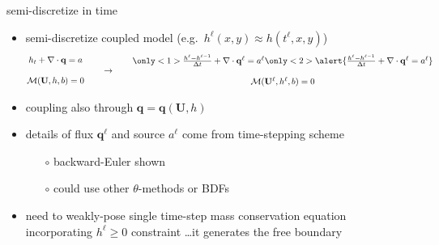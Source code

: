 \documentclass[xcolor={dvipsnames}]{beamer}
\newcommand\bq{\mathbf{q}}
\newcommand\bU{\mathbf{U}}
\newcommand\Div{\nabla\cdot}
\begin{document}
\begin{frame}{semi-discretize in time}

\begin{itemize}
\item semi-discretize coupled model (e.g.~$h^\ell(x,y) \approx h(t^\ell,x,y)$)
$$\begin{matrix}
 h_t + \Div\bq = a \\
 \phantom{foo} \\
 \mathcal{M}(\bU,h,b) = 0
\end{matrix} \qquad \to \qquad \begin{matrix}
 \only<1>{\singletsmc} \only<2>{\alert{\singletsmc}} \\
 \phantom{foo} \\
 \mathcal{M}(\bU^\ell,h^\ell,b) = 0
\end{matrix}$$
\item coupling also through $\bq=\bq(\bU,h)$
\item details of flux $\bq^\ell$ and source $a^\ell$ come from time-stepping scheme
        \begin{itemize}
        \item[$\circ$] backward-Euler shown
        \item[$\circ$] could use other $\theta$-methods or BDFs
        \end{itemize}
\item<2> \alert{need to weakly-pose single time-step mass conservation equation incorporating $h^\ell\ge 0$ constraint \dots it generates the free boundary}
\end{itemize}
\end{frame}
\end{document}
